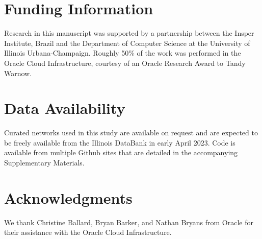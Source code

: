 \documentclass[11pt]{article}   	%
\begin{document}
\section*{Funding Information} Research in this manuscript was supported by a partnership between the Insper Institute, Brazil and the Department of Computer Science at the University of Illinois Urbana-Champaign. Roughly
50\% of the work was performed in the Oracle Cloud Infrastructure, courtesy of an Oracle Research Award to Tandy Warnow.

\section*{Data Availability}
Curated networks used in this study are available on request and are expected to be freely available from the Illinois DataBank in early April 2023. Code is available from multiple Github sites that are detailed in the accompanying
Supplementary Materials.

\section*{Acknowledgments} We thank Christine Ballard, Bryan Barker, and Nathan Bryans from Oracle for their assistance with the Oracle Cloud Infrastructure.



\end{document}
